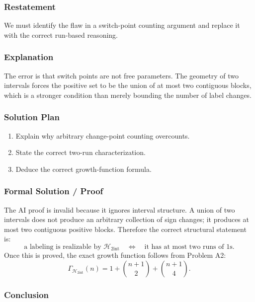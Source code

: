 \documentclass{article}
\newcommand{\growth}{\Gamma}
\newcommand{\classA}{\mathcal{H}_{2\mathrm{int}}}
\begin{document}
\begin{solutionbox}

\subsubsection{Restatement}

We must identify the flaw in a switch-point counting argument and replace it
with the correct run-based reasoning.

\subsubsection{Explanation}

The error is that switch points are not free parameters. The geometry of two
intervals forces the positive set to be the union of at most two contiguous
blocks, which is a stronger condition than merely bounding the number of label
changes.

\subsubsection{Solution Plan}

\begin{enumerate}[leftmargin=2.5em]
    \item Explain why arbitrary change-point counting overcounts.
    \item State the correct two-run characterization.
    \item Deduce the correct growth-function formula.
\end{enumerate}

\subsubsection{Formal Solution / Proof}

The AI proof is invalid because it ignores interval structure. A union of two
intervals does not produce an arbitrary collection of sign changes; it produces
at most two contiguous positive blocks. Therefore the correct structural
statement is:
\[
\text{a labeling is realizable by }\classA
\quad\Longleftrightarrow\quad
\text{it has at most two runs of }1\text{s}.
\]
Once this is proved, the exact growth function follows from Problem A2:
\[
\growth_{\classA}(n)=1+\binom{n+1}{2}+\binom{n+1}{4}.
\]

\subsubsection{Conclusion}


\end{solutionbox}
\end{document}
